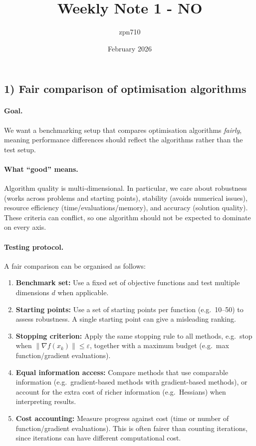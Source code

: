 \documentclass[12pt,a4paper]{article}
\title{Weekly Note 1 - NO}
\author{zpn710 }
\date{February 2026}
\begin{document}
\maketitle

\subsection*{1) Fair comparison of optimisation algorithms}

\paragraph{Goal.}
We want a benchmarking setup that compares optimisation algorithms \emph{fairly}, meaning performance differences should reflect the algorithms rather than the test setup.

\paragraph{What ``good'' means.}
Algorithm quality is multi-dimensional. In particular, we care about robustness (works across problems and starting points), stability (avoids numerical issues), resource efficiency (time/evaluations/memory), and accuracy (solution quality). These criteria can conflict, so one algorithm should not be expected to dominate on every axis.

\paragraph{Testing protocol.}
A fair comparison can be organised as follows:
\begin{enumerate}
    \item \textbf{Benchmark set:} Use a fixed set of objective functions and test multiple dimensions $d$ when applicable.
    \item \textbf{Starting points:} Use a set of starting points per function (e.g.\ 10--50) to assess robustness. A single starting point can give a misleading ranking.
    \item \textbf{Stopping criterion:} Apply the same stopping rule to all methods, e.g.\ stop when $\|\nabla f(x_k)\|\le \varepsilon$, together with a maximum budget (e.g.\ max function/gradient evaluations).
    \item \textbf{Equal information access:} Compare methods that use comparable information (e.g.\ gradient-based methods with gradient-based methods), or account for the extra cost of richer information (e.g.\ Hessians) when interpreting results.
    \item \textbf{Cost accounting:} Measure progress against cost (time or number of function/gradient evaluations). This is often fairer than counting iterations, since iterations can have different computational cost.
\end{enumerate}
\end{document}
